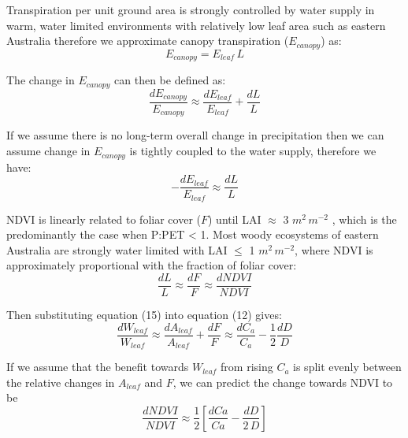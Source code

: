 \documentclass[gc, manuscript]{copernicus}
\begin{document}
Transpiration per unit ground area is strongly controlled by water
supply in warm, water limited environments with relatively low leaf area
such as eastern Australia \citep{spechtWaterUsePerennial1972} therefore
we approximate canopy transpiration (\(E_{canopy}\)) as:
\begin{equation}
E_{canopy}=E_{leaf}\,L
\end{equation}

The change in \(E_{canopy}\) can then be defined as: \begin{equation}
\frac{dE_{canopy}}{E_{canopy}} \approx \frac{dE_{leaf}}{E_{leaf}}+\frac{dL}{L}
\end{equation}

If we assume there is no long-term overall change in precipitation then
we can assume change in \(E_{canopy}\) is tightly coupled to the water
supply, therefore we have: \begin{equation}
-\frac{dE_{leaf}}{E_{leaf}} \approx \frac{dL}{L}
\end{equation}

NDVI is linearly related to foliar cover (\(F\)) until LAI \(\approx\) 3
\(m^2\,m^{-2}\) \citep{carlsonRelationNDVIFractional1997a}, which is the
predominantly the case when P:PET \textless{} 1. Most woody ecosystems
of eastern Australia are strongly water limited with LAI \(\leq\) 1
\(m^2\,m^{-2}\), where NDVI is approximately proportional with the
fraction of foliar cover: \begin{equation}
\frac{dL}{L}\approx\frac{dF}{F}\approx\frac{d NDVI}{NDVI}
\end{equation}

Then substituting equation (15) into equation (12) gives:
\begin{equation}
\frac{dW_{leaf}}{W_{leaf}} \approx  \frac{dA_{leaf}}{A_{leaf}} + \frac{dF}{F} \approx \frac{dC_a}{C_a} - \frac{1}{2}\frac{dD}{D}
\end{equation}

If we assume that the benefit towards \(W_{leaf}\) from rising \(C_a\)
is split evenly between the relative changes in \(A_{leaf}\) and \(F\),
we can predict the change towards NDVI to be \begin{equation}
\frac{dNDVI}{NDVI} \approx \frac{1}{2}[\frac{dCa}{Ca}-\frac{dD}{2\,D}]
\end{equation}
\end{document}
